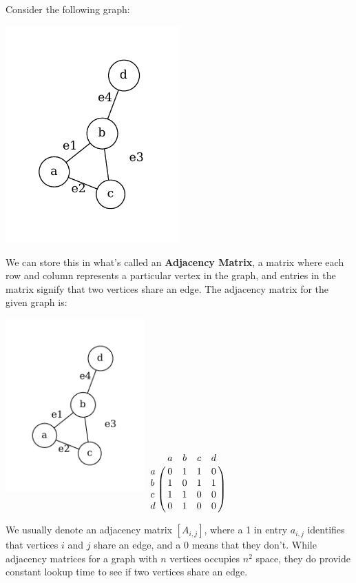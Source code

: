 Consider the following graph:
\begin{center}
    \includegraphics[width=0.5\textwidth]{Chapter1/mat.pdf}
\end{center}
We can store this in what's called an \textbf{Adjacency Matrix}, a matrix where each row and column represents a particular vertex in the graph, and entries in the matrix signify that two vertices share an edge. The adjacency matrix for the given graph is:
\begin{center}
    \includegraphics[width=0.4\textwidth]{Chapter1/mat.pdf} $\bordermatrix{~ & a & b & c & d \cr
                                                                           a & 0 & 1 & 1 & 0 \cr
                                                                           b & 1 & 0 & 1 & 1 \cr
                                                                           c & 1 & 1 & 0 & 0 \cr
                                                                           d & 0 & 1 & 0 & 0 }$
\end{center}
We usually denote an adjacency matrix $[A_{i, j}]$, where a 1 in entry $a_{i, j}$ identifies that vertices $i$ and $j$ share an edge, and a 0 means that they don't. While adjacency matrices for a graph with $n$ vertices occupies $n^2$ space, they do provide constant lookup time to see if two vertices share an edge.

